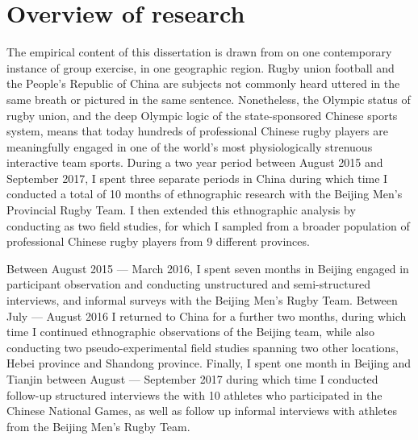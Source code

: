 \section{Overview of research}
The empirical content of this dissertation is drawn from on one contemporary instance of group exercise, in one geographic region.  Rugby union football and the People's Republic of China are subjects not commonly heard uttered in the same breath or pictured in the same sentence.  Nonetheless, the Olympic status of rugby union, and the deep Olympic logic of the state-sponsored Chinese sports system, means that today hundreds of professional Chinese rugby players are meaningfully engaged in one of the world's most physiologically strenuous interactive team sports.  During a two year period between August 2015 and September 2017, I spent three separate periods in China during which time I conducted a total of 10 months of ethnographic research with the Beijing Men's Provincial Rugby Team.  I then extended this ethnographic analysis by conducting as two field studies, for which I sampled from a broader population of professional Chinese rugby players from 9 different provinces.

Between August 2015 --- March 2016, I spent seven months in Beijing engaged in participant observation and conducting unstructured and semi-structured interviews, and informal surveys with the Beijing Men's Rugby Team. Between July --- August 2016 I returned to China for a further two months, during which time I continued ethnographic observations of the Beijing team, while also conducting two pseudo-experimental field studies spanning two other locations, Hebei province and Shandong province. Finally, I spent one month in Beijing and Tianjin between August --- September 2017 during which time I conducted follow-up structured interviews the with 10 athletes who participated in the Chinese National Games, as well as follow up informal interviews with athletes from the Beijing Men's Rugby Team.



